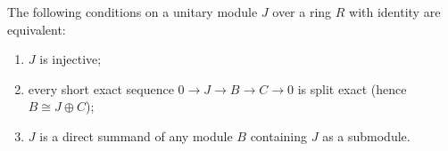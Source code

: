 The following conditions on a unitary module $J$ over a ring $R$ with identity are equivalent:
\begin{enumerate}
\item[(i)] $J$ is injective;
\item[(ii)] every short exact sequence $0 \to J \to B \to C \to 0$ is split exact (hence $B \cong J \oplus C$);
\item[(iii)] $J$ is a direct summand of any module $B$ containing $J$ as a submodule.
\end{enumerate}
